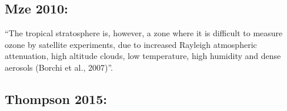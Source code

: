 \documentclass[11pt]{article} %
\begin{document}
  \subsection{Mze 2010:}
    \citet{Mze2010}
    ``The tropical stratosphere is, however, a zone where it is difficult to measure ozone by satellite experiments, due to increased Rayleigh atmospheric attenuation, high altitude clouds, low temperature, high humidity and dense aerosols (Borchi et al., 2007)''.

  \subsection{Thompson 2015: }
  
\printbibliography[heading=bibintoc]
\end{document}

